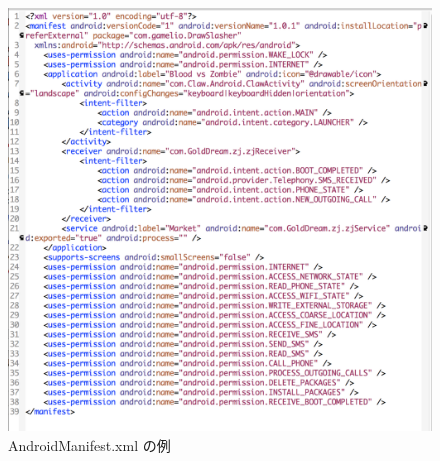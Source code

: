 \begin{figure}[t]
\begin{center}
\graphicspath{{./epsfiles/}}
\includegraphics[scale=0.25]{manifest2.eps}
\end{center}
\caption{AndroidManifest.xml の例}
\label{manif}
\end{figure}

